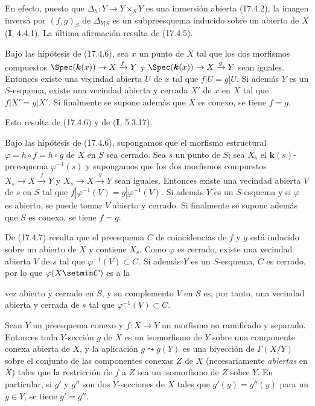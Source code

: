 En efecto, puesto que $\Delta_h:Y\to Y\times_S Y$ es una inmersión abierta (17.4.2), la imagen inversa por $(f,g)_S$ de $\Delta_{Y|S}$ es un subpreesquema inducido sobre un abierto de $X$ (\textbf I, 4.4.1). La última afirmación resulta de (17.4.5).

\begin{corollary}[17.4.7]
\label{IV.17.4.7}
Bajo las hipótesis de \textup{(17.4.6)}, sea $x$ un punto de $X$ tal que los dos morfismos compuestos $\Spec(\boldsymbol{k}(x))\to X\xrightarrow{f}Y$ y $\Spec(\boldsymbol{k}(x))\to X\xrightarrow{g}Y$ sean iguales. Entonces existe una vecindad abierta $U$ de $x$ tal que $f|U=g|U$. Si además $Y$ es un $S$-esquema, existe una vecindad abierta y cerrada $X'$ de $x$ en $X$ tal que $f|X'=g|X'$. Si finalmente se supone además que $X$ es conexo, se tiene $f=g$.
\end{corollary}

Esto resulta de (17.4.6) y de (\textbf I, 5.3.17).

\begin{corollary}[17.4.8]
\label{IV.17.4.8}
Bajo las hipótesis de \textup{(17.4.6)}, supongamos que el morfismo estructural $\varphi=h\circ f=h\circ g$ de $X$ en $S$ sea cerrado. Sea $s$ un punto de $S$; sea $X_s$ el $\boldsymbol{k}(s)$-preesquema $\varphi^{-1}(s)$ y supongamos que los dos morfismos compuestos $X_s\to X\xrightarrow{f}Y$ y $X_s\to X\xrightarrow{g}Y$ sean iguales. Entonces existe una vecindad abierta $V$ de $s$ en $S$ tal que $f|\varphi^{-1}(V)=g|\varphi^{-1}(V)$. Si además $Y$ es un $S$-esquema y si $\varphi$ es abierto, se puede tomar $V$ abierto y cerrado. Si finalmente se supone además que $S$ es conexo, se tiene $f=g$.
\end{corollary}

De (17.4.7) resulta que el preesquema $C$ de coincidencias de $f$ y $g$ está inducido sobre un abierto de $X$ y contiene $X_s$. Como $\varphi$ es cerrado, existe una vecindad abierta $V$ de $s$ tal que $\varphi^{-1}(V)\subset C$. Si además $Y$ es un $S$-esquema, $C$ es cerrado, por lo que $\varphi(X\setmin C)$ es a la

vez abierto y cerrado en $S$, y su complemento $V$ en $S$ es, por tanto, una vecindad abierta y cerrada de $s$ tal que $\varphi^{-1}(V)\subset C$.

\begin{proposition}[17.4.9]
\label{IV.17.4.9}
Sean $Y$ un preesquema conexo y $f:X\to Y$ un morfismo no ramificado y separado. Entonces toda $Y$-sección $g$ de $X$ es un isomorfismo de $Y$ sobre una componente conexa abierta de $X$, y la aplicación $g\leadsto g(Y)$ es una biyección de $\Gamma(X/Y)$ sobre el conjunto de las componentes conexas $Z$ de $X$ \textup{(necesariamente \emph{abiertas} en $X$)} tales que la restricción de $f$ a $Z$ sea un isomorfismo de $Z$ sobre $Y$. En particular, si $g'$ y $g''$ son dos $Y$-secciones de $X$ tales que $g'(y)=g''(y)$ para un $y\in Y$, se tiene $g'=g''$.
\end{proposition}

